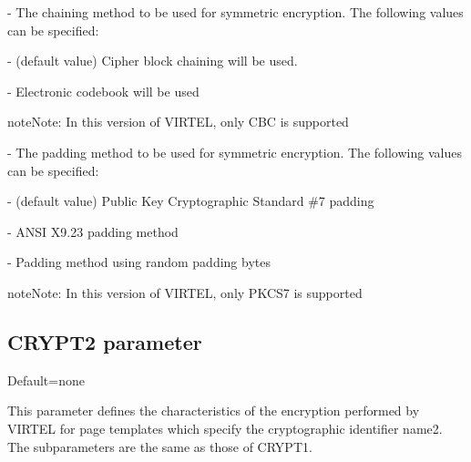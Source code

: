 \documentclass[letterpaper,10pt,english]{sphinxmanual}
\begin{document}
 - The chaining method to be used for symmetric encryption. The following values can be specified:

 - (default value) Cipher block chaining will be used.

 - Electronic codebook will be used

\begin{sphinxadmonition}{note}{Note:}
In this version of VIRTEL, only CBC is supported
\end{sphinxadmonition}

 - The padding method to be used for symmetric encryption. The following values can be specified:

 - (default value) Public Key Cryptographic Standard \#7 padding

 - ANSI X9.23 padding method

 - Padding method using random padding bytes

\begin{sphinxadmonition}{note}{Note:}
In this version of VIRTEL, only PKCS7 is supported
\end{sphinxadmonition}

\ignorespaces 

\subsection{CRYPT2 parameter}
\label{\detokenize{Installation_Guide:crypt2-parameter}}\label{\detokenize{Installation_Guide:index-50}}
\begin{sphinxVerbatim}[commandchars=\\\{\}]
\PYG{p}{[}\PYG{p}{]}\PYG{p}{[}\PYG{p}{]}\PYG{p}{[}\PYG{p}{]}\PYG{p}{[}\PYG{p}{]}\PYG{p}{[}\PYG{p}{]}\PYG{p}{[}\PYG{p}{]}
\end{sphinxVerbatim}

Default=none

This parameter defines the characteristics of the encryption performed by VIRTEL for page templates which specify the cryptographic identifier name2. The subparameters are the same as those of CRYPT1.
\end{document}
